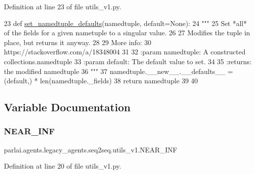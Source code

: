 Definition at line 23 of file utils\+\_\+v1.\+py.


\begin{DoxyCode}
23 \textcolor{keyword}{def }\hyperlink{namespaceparlai_1_1agents_1_1legacy__agents_1_1seq2seq_1_1utils__v1_a17553492abb2e671bc3fc58e1e3a96b0}{set\_namedtuple\_defaults}(namedtuple, default=None):
24     \textcolor{stringliteral}{"""}
25 \textcolor{stringliteral}{    Set *all* of the fields for a given nametuple to a singular value.}
26 \textcolor{stringliteral}{}
27 \textcolor{stringliteral}{    Modifies the tuple in place, but returns it anyway.}
28 \textcolor{stringliteral}{}
29 \textcolor{stringliteral}{    More info:}
30 \textcolor{stringliteral}{    https://stackoverflow.com/a/18348004}
31 \textcolor{stringliteral}{}
32 \textcolor{stringliteral}{    :param namedtuple: A constructed collections.namedtuple}
33 \textcolor{stringliteral}{    :param default: The default value to set.}
34 \textcolor{stringliteral}{}
35 \textcolor{stringliteral}{    :returns: the modified namedtuple}
36 \textcolor{stringliteral}{    """}
37     namedtuple.\_\_new\_\_.\_\_defaults\_\_ = (default,) * len(namedtuple.\_fields)
38     \textcolor{keywordflow}{return} namedtuple
39 
40 
\end{DoxyCode}


\subsection{Variable Documentation}
\mbox{\label{namespaceparlai_1_1agents_1_1legacy__agents_1_1seq2seq_1_1utils__v1_a8633d2afbc49aa79847d77b922dbed81}} 
\subsubsection{\texorpdfstring{N\+E\+A\+R\+\_\+\+I\+NF}{NEAR\_INF}}
{\footnotesize\ttfamily parlai.\+agents.\+legacy\+\_\+agents.\+seq2seq.\+utils\+\_\+v1.\+N\+E\+A\+R\+\_\+\+I\+NF}



Definition at line 20 of file utils\+\_\+v1.\+py.

